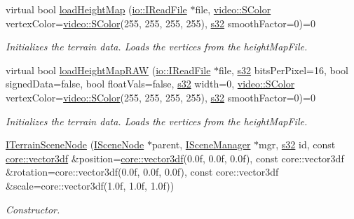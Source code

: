 \begin{DoxyCompactItemize}
virtual bool \hyperlink{classirr_1_1scene_1_1ITerrainSceneNode_ae5c598195e3faafb7cc58b71beb7ee1b}{load\+Height\+Map} (\hyperlink{classirr_1_1io_1_1IReadFile}{io\+::\+I\+Read\+File} $\ast$file, \hyperlink{classirr_1_1video_1_1SColor}{video\+::\+S\+Color} vertex\+Color=\hyperlink{classirr_1_1video_1_1SColor}{video\+::\+S\+Color}(255, 255, 255, 255), \hyperlink{namespaceirr_ac66849b7a6ed16e30ebede579f9b47c6}{s32} smooth\+Factor=0)=0
\begin{DoxyCompactList}\small\item\em Initializes the terrain data. Loads the vertices from the height\+Map\+File. \end{DoxyCompactList}\item 
virtual bool \hyperlink{classirr_1_1scene_1_1ITerrainSceneNode_a43d92272d8d860dda1c74b9fe795f062}{load\+Height\+Map\+R\+AW} (\hyperlink{classirr_1_1io_1_1IReadFile}{io\+::\+I\+Read\+File} $\ast$file, \hyperlink{namespaceirr_ac66849b7a6ed16e30ebede579f9b47c6}{s32} bits\+Per\+Pixel=16, bool signed\+Data=false, bool float\+Vals=false, \hyperlink{namespaceirr_ac66849b7a6ed16e30ebede579f9b47c6}{s32} width=0, \hyperlink{classirr_1_1video_1_1SColor}{video\+::\+S\+Color} vertex\+Color=\hyperlink{classirr_1_1video_1_1SColor}{video\+::\+S\+Color}(255, 255, 255, 255), \hyperlink{namespaceirr_ac66849b7a6ed16e30ebede579f9b47c6}{s32} smooth\+Factor=0)=0
\begin{DoxyCompactList}\small\item\em Initializes the terrain data. Loads the vertices from the height\+Map\+File. \end{DoxyCompactList}\item 
\mbox{\label{classirr_1_1scene_1_1ITerrainSceneNode_a152a472837bbce22d1221086a47d8af5}} 
\hyperlink{classirr_1_1scene_1_1ITerrainSceneNode_a152a472837bbce22d1221086a47d8af5}{I\+Terrain\+Scene\+Node} (\hyperlink{classirr_1_1scene_1_1ISceneNode}{I\+Scene\+Node} $\ast$parent, \hyperlink{classirr_1_1scene_1_1ISceneManager}{I\+Scene\+Manager} $\ast$mgr, \hyperlink{namespaceirr_ac66849b7a6ed16e30ebede579f9b47c6}{s32} id, const \hyperlink{namespaceirr_1_1core_ae6e2b2a6c552833ebbd5b7463d03586b}{core\+::vector3df} \&position=\hyperlink{namespaceirr_1_1core_ae6e2b2a6c552833ebbd5b7463d03586b}{core\+::vector3df}(0.\+0f, 0.\+0f, 0.\+0f), const core\+::vector3df \&rotation=core\+::vector3df(0.\+0f, 0.\+0f, 0.\+0f), const core\+::vector3df \&scale=core\+::vector3df(1.\+0f, 1.\+0f, 1.\+0f))
\begin{DoxyCompactList}\small\item\em Constructor. \end{DoxyCompactList}\item 

\end{DoxyCompactItemize}
